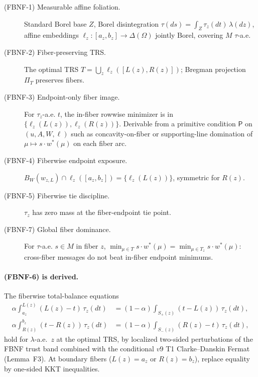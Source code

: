 \documentclass[11pt]{article}
\theoremstyle{definition}
\theoremstyle{remark}
\begin{document}
\begin{description}
  \item[(FBNF-1) Measurable affine foliation.] Standard Borel base
    $Z$, Borel disintegration $\tau(ds) = \int_Z \tau_z(dt)\,\lambda(dz)$,
    affine embeddings $\ell_z:[a_z, b_z]\to\Delta(\Omega)$ jointly Borel,
    covering $M$ $\tau$-a.e.
  \item[(FBNF-2) Fiber-preserving TRS.] The optimal TRS $T = \bigcup_z \ell_z([L(z), R(z)])$;
    Bregman projection $\Pi_T$ preserves fibers.
  \item[(FBNF-3) Endpoint-only fiber image.] For $\tau_z$-a.e. $t$, the
    in-fiber rowwise minimizer is in $\{\ell_z(L(z)), \ell_z(R(z))\}$.
    Derivable from a primitive condition $\mathsf{P}$ on $(u, A, W, \ell)$
    such as concavity-on-fiber or supporting-line domination of
    $\mu\mapsto s\cdot w^*(\mu)$ on each fiber arc.
  \item[(FBNF-4) Fiberwise endpoint exposure.] $B_W(w_{z,L})\cap\ell_z([a_z, b_z]) = \{\ell_z(L(z))\}$,
    symmetric for $R(z)$.
  \item[(FBNF-5) Fiberwise tie discipline.] $\tau_z$ has zero mass at
    the fiber-endpoint tie point.
  \item[(FBNF-7) Global fiber dominance.] For $\tau$-a.e. $s\in M$ in
    fiber $z$, $\min_{\mu\in T} s\cdot w^*(\mu) = \min_{\mu\in T_z} s\cdot w^*(\mu)$:
    cross-fiber messages do not beat in-fiber endpoint minimums.
\end{description}

\paragraph{(FBNF-6) is derived.} The fiberwise total-balance equations
\begin{align*}
\alpha\!\int_{a_z}^{L(z)}\!(L(z)-t)\,\tau_z(dt) &= (1-\alpha)\!\int_{S_+(z)}\!(t-L(z))\,\tau_z(dt), \\
\alpha\!\int_{R(z)}^{b_z}\!(t-R(z))\,\tau_z(dt) &= (1-\alpha)\!\int_{S_-(z)}\!(R(z)-t)\,\tau_z(dt),
\end{align*}
hold for $\lambda$-a.e.\ $z$ at the optimal TRS, by localized two-sided
perturbations of the FBNF trust band combined with the conditional $v9$
T1 Clarke--Danskin Fermat (Lemma~F3). At boundary fibers
($L(z)=a_z$ or $R(z)=b_z$), replace equality by one-sided KKT
inequalities.
\end{document}
